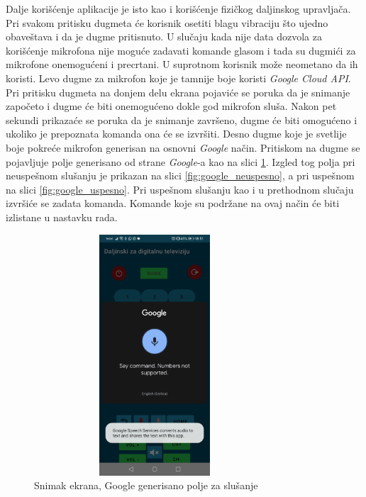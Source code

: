 \documentclass[implementacija.tex]{subfiles}
\begin{document}
Dalje korišćenje aplikacije je isto kao i korišćenje fizičkog daljinskog upravljača. Pri svakom pritisku dugmeta će korisnik osetiti blagu vibraciju što ujedno obaveštava i da je dugme pritisnuto. U slučaju kada nije data dozvola za korišćenje mikrofona nije moguće zadavati komande glasom i tada su dugmići za mikrofone onemogućeni i precrtani. U suprotnom korisnik može neometano da ih koristi. Levo dugme za mikrofon koje je tamnije boje koristi \textit{Google Cloud API}. Pri pritisku dugmeta na donjem delu ekrana pojaviće se poruka da je snimanje započeto i dugme će biti onemogućeno dokle god mikrofon sluša. Nakon pet sekundi prikazaće se poruka da je snimanje završeno, dugme će biti omogućeno i ukoliko je prepoznata komanda ona će se izvršiti. Desno dugme koje je svetlije boje pokreće mikrofon generisan na osnovni \textit{Google} način. Pritiskom na dugme se pojavljuje polje generisano od strane \textit{Google}-a kao na slici \ref{fig:google_slusanje}. Izgled tog polja pri neuspešnom slušanju je prikazan na slici \ref{fig:google_neuspesno}, a pri uspešnom na slici \ref{fig:google_uspesno}. Pri uspešnom slušanju kao i u prethodnom slučaju izvršiće se zadata komanda. Komande koje su podržane na ovaj način će biti izlistane u nastavku rada.  

\begin{figure}[h!]
  \centering
  \label{fig:google_slusanje}
  \includegraphics[width=9cm,height=9cm,keepaspectratio]{Implementacija/snimci_ekrana/10_obican_google_slusanje.jpg}
  \caption{Snimak ekrana, Google generisano polje za slušanje}
\end{figure}
\end{document}
